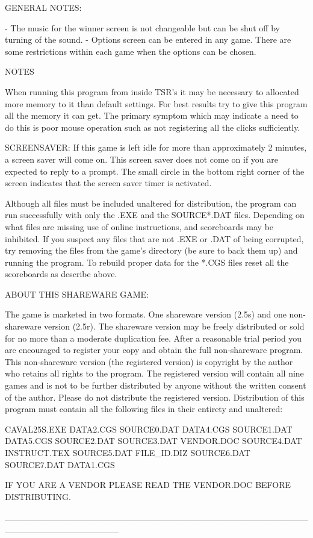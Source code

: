 GENERAL NOTES:

- The music for the winner screen is not changeable but can be shut
off by turning of the sound.
- Options screen can be entered in any game. There are some
restrictions within each game when the options can be chosen.


NOTES

When running this program from inside TSR's it may be necessary to 
allocated more memory to it than default settings.  For best results
try to give this program all the memory it can get.  The primary
symptom which may indicate a need to do this is poor mouse operation
such as not registering all the clicks sufficiently.

SCREENSAVER: If this game is left idle for more than approximately
2 minutes, a screen saver will come on.  This screen saver does not
come on if you are expected to reply to a prompt.  The small circle
in the bottom right corner of the screen indicates that the screen
saver timer is activated.

Although all files must be included unaltered for distribution, the
program can run successfully with only the .EXE and the SOURCE*.DAT
files.  Depending on what files are missing use of online
instructions, and scoreboards may be inhibited.  If you suspect
any files that are not .EXE or .DAT of being corrupted, try
removing the files from the game's directory (be sure to back
them up) and running the program.  To rebuild proper data for the
*.CGS files reset all the scoreboards as describe above.

ABOUT THIS SHAREWARE GAME:

The game is marketed in two formats.  One shareware version (2.5s)
and one non-shareware version (2.5r).  The shareware version may
be freely distributed or sold for no more than a moderate
duplication fee. After a reasonable trial period you are
encouraged to register your copy and obtain the full non-shareware
program.  This non-shareware version (the registered version) is
copyright by the author who retains all rights to the program.
The registered version will contain all nine games and is not to
be further distributed by anyone without the written consent of
the author.  Please do not distribute the registered version.
Distribution of this program must contain all the following
files in their entirety and unaltered:

	CAVAL25S.EXE      DATA2.CGS
	SOURCE0.DAT       DATA4.CGS
	SOURCE1.DAT       DATA5.CGS
	SOURCE2.DAT       
	SOURCE3.DAT       VENDOR.DOC
	SOURCE4.DAT       INSTRUCT.TEX
	SOURCE5.DAT       FILE_ID.DIZ
	SOURCE6.DAT
	SOURCE7.DAT
	DATA1.CGS

IF YOU ARE A VENDOR PLEASE READ THE VENDOR.DOC BEFORE DISTRIBUTING.  
 

__________________________________________________________________
